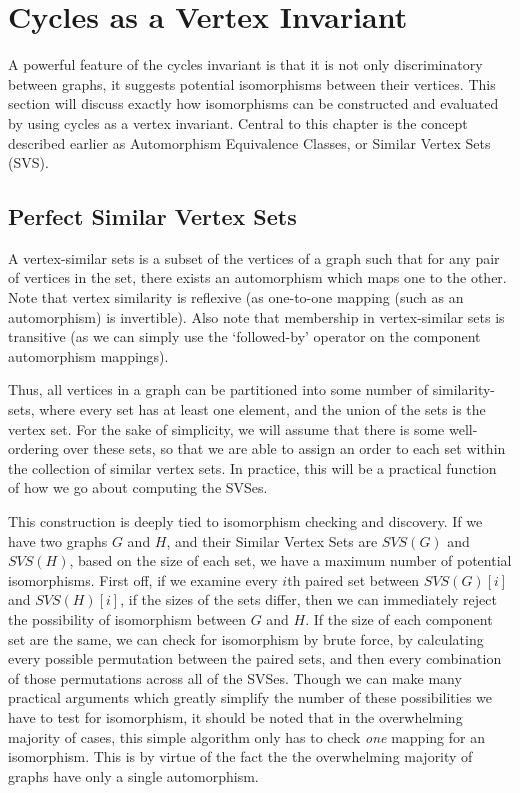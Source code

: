 \chapter{Cycles as a Vertex Invariant}

A powerful feature of the cycles invariant is that it is not only discriminatory between graphs, it suggests potential isomorphisms between their vertices.
This section will discuss exactly how isomorphisms can be constructed and evaluated by using cycles as a vertex invariant.
Central to this chapter is the concept described earlier as Automorphism Equivalence Classes, or Similar Vertex Sets (SVS).

\section{Perfect Similar Vertex Sets}

A vertex-similar sets is a subset of the vertices of a graph such that for any pair of vertices in the set, there exists an automorphism which maps one to the other.
Note that vertex similarity is reflexive (as one-to-one mapping (such as an automorphism) is invertible). 
Also note that membership in vertex-similar sets is transitive (as we can simply use the `followed-by' operator on the component automorphism mappings).

Thus, all vertices in a graph can be partitioned into some number of similarity-sets, where every set has at least one element, and the union of the sets is the vertex set.
For the sake of simplicity, we will assume that there is some well-ordering over these sets, so that we are able to assign an order to each set within the collection of similar vertex sets.
In practice, this will be a practical function of how we go about computing the SVSes.

This construction is deeply tied to isomorphism checking and discovery.
If we have two graphs $G$ and $H$, and their Similar Vertex Sets are $SVS(G)$ and $SVS(H)$, based on the size of each set, we have a maximum number of potential isomorphisms.
First off, if we examine every $i$th paired set between $SVS(G)[i]$ and  $SVS(H)[i]$, if the sizes of the sets differ, then we can immediately reject the possibility of isomorphism between $G$ and $H$.
If the size of each component set are the same, we can check for isomorphism by brute force, by calculating every possible permutation between the paired sets, and then every combination of those permutations across all of the SVSes.
Though we can make many practical arguments which greatly simplify the number of these possibilities we have to test for isomorphism, it should be noted that in the overwhelming majority of cases, this simple algorithm only has to check \emph{one} mapping for an isomorphism.
This is by virtue of the fact the the overwhelming majority of graphs have only a single automorphism.

